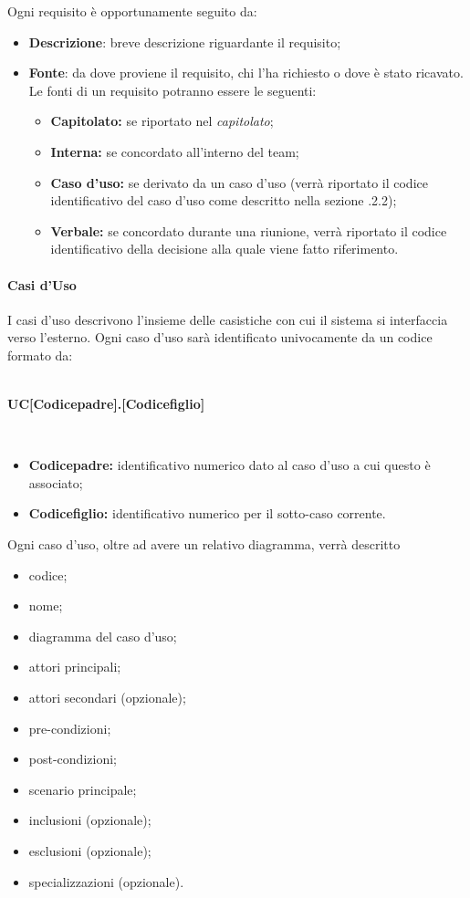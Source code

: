 Ogni requisito è opportunamente seguito da:
\begin{itemize}
  \item \textbf{Descrizione}: breve descrizione riguardante il requisito;
  \item \textbf{Fonte}: da dove proviene il requisito, chi l'ha richiesto o dove è stato ricavato. Le fonti di un requisito potranno essere le seguenti:
  \begin{itemize}
  	\item \textbf{Capitolato\glos:} se riportato nel \textit{capitolato\glos};
  	\item \textbf{Interna:} se concordato all'interno del team;
  	\item \textbf{Caso d'uso:} se derivato da un caso d'uso (verrà riportato il codice identificativo del caso d'uso come descritto nella sezione .2.2);
  	\item \textbf{Verbale:} se concordato durante una riunione, verrà riportato il codice identificativo della decisione alla quale viene fatto riferimento.
  \end{itemize}
\end{itemize}

\paragraph{Casi d'Uso}
I casi d'uso descrivono l'insieme delle casistiche con cui il sistema si interfaccia verso l'esterno. Ogni caso d'uso sarà identificato univocamente da un codice formato da:
\\\\
\centerline{\textbf{UC[Codicepadre].[Codicefiglio]}}\\

\begin{itemize}
	\item \textbf{Codicepadre:} identificativo numerico dato al caso d'uso a cui questo è associato;
	\item \textbf{Codicefiglio:} identificativo numerico per il sotto-caso corrente.
\end{itemize}
Ogni caso d'uso, oltre ad avere un relativo diagramma, verrà descritto 
\begin{itemize}
  \item codice;
  \item nome;
  \item diagramma del caso d'uso;
  \item attori principali;
  \item attori secondari (opzionale);
  \item pre-condizioni;
  \item post-condizioni;
  \item scenario principale;
  \item inclusioni (opzionale);
  \item esclusioni (opzionale);
  \item specializzazioni (opzionale).
\end{itemize}

